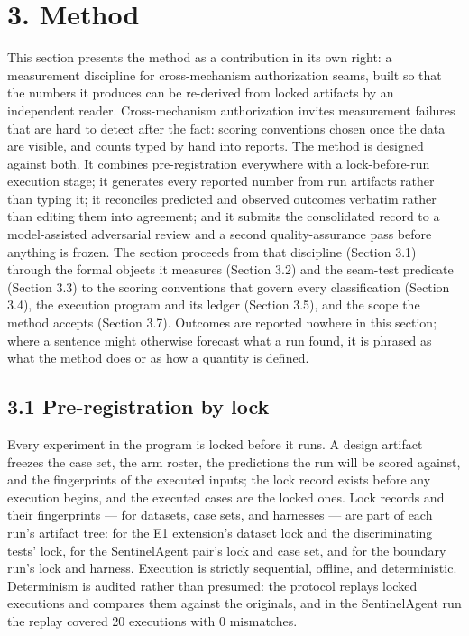 \documentclass[
  10pt,
]{article}
\renewcommand{\_}{\origunderscore\allowbreak}
\begin{document}
\section{3. Method}\label{method}

This section presents the method as a contribution in its own right: a
measurement discipline for cross-mechanism authorization seams, built so
that the numbers it produces can be re-derived from locked artifacts by
an independent reader. Cross-mechanism authorization invites measurement
failures that are hard to detect after the fact: scoring conventions
chosen once the data are visible, and counts typed by hand into reports.
The method is designed against both. It combines pre-registration
everywhere with a lock-before-run execution stage; it generates every
reported number from run artifacts rather than typing it; it reconciles
predicted and observed outcomes verbatim rather than editing them into
agreement; and it submits the consolidated record to a model-assisted
adversarial review and a second quality-assurance pass before anything
is frozen. The section proceeds from that discipline (Section 3.1)
through the formal objects it measures (Section 3.2) and the seam-test
predicate (Section 3.3) to the scoring conventions that govern every
classification (Section 3.4), the execution program and its ledger
(Section 3.5), and the scope the method accepts (Section 3.7). Outcomes
are reported nowhere in this section; where a sentence might otherwise
forecast what a run found, it is phrased as what the method does or as
how a quantity is defined.

\subsection{3.1 Pre-registration by
lock}\label{pre-registration-by-lock}

Every experiment in the program is locked before it runs. A design
artifact freezes the case set, the arm roster, the predictions the run
will be scored against, and the fingerprints of the executed inputs; the
lock record exists before any execution begins, and the executed cases
are the locked ones. Lock records and their fingerprints --- for
datasets, case sets, and harnesses --- are part of each run's artifact
tree: for the E1 extension's dataset lock and the discriminating tests'
lock, for the SentinelAgent pair's lock and case set, and for the
boundary run's lock and harness. Execution is strictly sequential,
offline, and deterministic. Determinism is audited rather than presumed:
the protocol replays locked executions and compares them against the
originals, and in the SentinelAgent run the replay covered 20 executions
with 0 mismatches.
\end{document}

